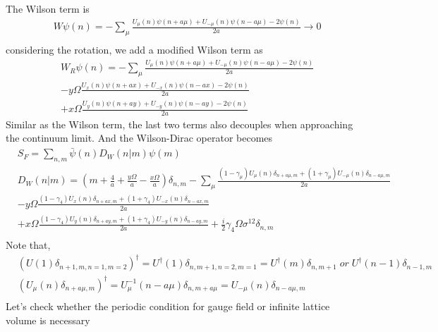 The Wilson term is
\begin{equation}
\begin{split}
&W\psi (n)= -\sum _{\mu}\frac{U_{\mu}(n)\psi(n+a\mu)+U_{-\mu}(n)\psi(n-a\mu)-2\psi(n)}{2a} \to 0\\
\end{split}
\end{equation}
considering the rotation, we add a modified Wilson term as
\begin{equation}
\begin{split}
&W_R\psi (n)= -\sum _{\mu}\frac{U_{\mu}(n)\psi(n+a\mu)+U_{-\mu}(n)\psi(n-a\mu)-2\psi(n)}{2a}\\
&-y\Omega \frac{U_{x}(n)\psi(n+ax)+U_{-x}(n)\psi(n-ax)-2\psi(n)}{2a}\\
&+x\Omega \frac{U_{y}(n)\psi(n+ay)+U_{-y}(n)\psi(n-ay)-2\psi(n)}{2a}
\end{split}
\end{equation}
Similar as the Wilson term, the last two terms also decouples when approaching the continuum limit. And the Wilson-Dirac operator becomes
\begin{equation}
\begin{split}
&S_F=\sum _{n,m}\bar{\psi }(n) D_W(n|m) \psi(m)\\
&D_W(n|m)=\left(m+\frac{4}{a}+\frac{y\Omega}{a}-\frac{x\Omega}{a}\right)\delta _{n,m}-\sum _{\mu}\frac{(1-\gamma _{\mu})U_{\mu}(n)\delta _{n+a\mu,m}+(1+\gamma _{\mu})U_{-\mu}(n)\delta _{n-a\mu,m}}{2a}\\
&-y\Omega \frac{(1-\gamma _4)U_{x}(n)\delta _{n+ax,m}+(1+\gamma _4)U_{-x}(n)\delta _{n-ax,m}}{2a}\\
&+x\Omega \frac{(1-\gamma _4)U_{y}(n)\delta _{n+ay,m}+(1+\gamma _4)U_{-y}(n)\delta _{n-ay,m}}{2a} +\frac{i}{2}\gamma _4\Omega \sigma ^{12}\delta _{n,m}\\
\end{split}
\end{equation}
Note that,
\begin{equation}
\begin{split}
&\left(U(1)\delta _{n+1,m,n=1,m=2}\right)^{\dagger}=U^{\dagger}(1)\delta _{n,m+1,n=2,m=1}=U^{\dagger}(m)\delta _{n,m+1}\;or\;U^{\dagger}(n-1)\delta _{n-1,m}\\
&\left(U_{\mu}(n)\delta _{n+a\mu,m}\right)^{\dagger}=U_{\mu}^{-1}(n-a\mu)\delta _{n,m+a\mu}=U_{-\mu}(n)\delta _{n-a\mu,m}\\
\end{split}
\end{equation}
Let's check whether the periodic condition for gauge field or infinite lattice volume is necessary
